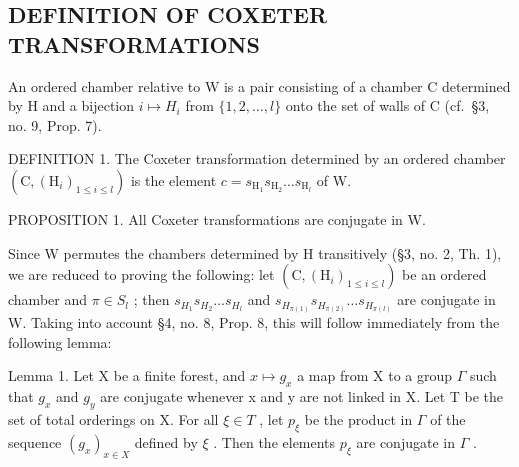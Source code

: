 \subsection{DEFINITION OF COXETER TRANSFORMATIONS}

An ordered chamber relative to W is a pair consisting of a chamber C determined by H and a bijection \(i \mapsto H_{i}\) from \(\{1, 2, \ldots, l\}\) onto the set of walls of C (cf.~§3, no. 9, Prop. 7).

DEFINITION 1. The Coxeter transformation determined by an ordered chamber \((\mathrm{C},(\mathrm{H}_i)_{1\leqslant i\leqslant l})\) is the element \(c = s_{\mathrm{H}_1}s_{\mathrm{H}_2}\dots s_{\mathrm{H}_l}\) of W.

PROPOSITION 1. All Coxeter transformations are conjugate in W.

Since W permutes the chambers determined by H transitively (§3, no. 2, Th. 1), we are reduced to proving the following: let \((\mathrm{C},(\mathrm{H}_{i})_{1\leqslant i\leqslant l})\) be an ordered chamber and \(\pi\in S_{l}\) ; then \(s_{H_{1}}s_{H_{2}}\ldots s_{H_{l}}\) and \(s_{H_{\pi(1)}}s_{H_{\pi(2)}}\ldots s_{H_{\pi(l)}}\) are conjugate in W. Taking into account §4, no. 8, Prop. 8, this will follow immediately from the following lemma:

Lemma 1. Let X be a finite forest, and \(x \mapsto g_{x}\) a map from X to a group \(\Gamma\) such that \(g_{x}\) and \(g_{y}\) are conjugate whenever x and y are not linked in X. Let T be the set of total orderings on X. For all \(\xi \in T\) , let \(p_{\xi}\) be the product in \(\Gamma\) of the sequence \((g_{x})_{x \in X}\) defined by \(\xi\) . Then the elements \(p_{\xi}\) are conjugate in \(\Gamma\) .

